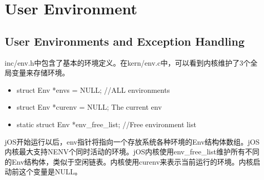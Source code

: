 \chapter{User Environment}
\label{cha:user_environment}

\section{User Environments and Exception Handling}
\par inc/env.h中包含了基本的环境定义。在kern/env.c中，可以看到内核维护了3个全局变量来存储环境。
\begin{itemize}
    \item struct Env *envs = NULL; //ALL environments
    \item struct Env *curenv = NULL; The current env
    \item static struct Env *env\_free\_list; //Free environment list
\end{itemize}
\par jOS开始运行以后，env指针将指向一个存放系统各种环境的Env结构体数组。jOS内核最大支持NENV个同时活动的环境。jOS内核使用env\_free\_list维护所有不同的Env结构体，类似于空闲链表。内核使用curenv来表示当前运行的环境。内核启动前这个变量是NULL。

